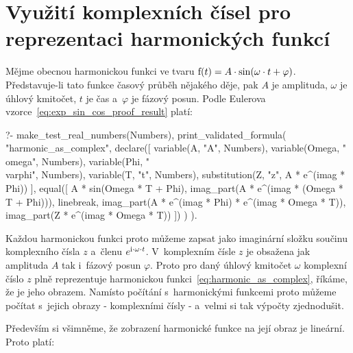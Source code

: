 \section{Využití komplexních čísel pro reprezentaci harmonických funkcí}

Mějme obecnou harmonickou funkci ve tvaru \(\mathrm{f}(t) = A \cdot \sin(\omega \cdot t + \varphi)\). Představuje-li tato funkce časový průběh nějakého děje, pak \(A\) je amplituda, \(\omega\) je úhlový kmitočet, \(t\) je čas a~\(\varphi\) je fázový posun. Podle Eulerova vzorce~\eqref{eq:exp_sin_cos_proof_result} platí:

\begin{prolog}
?-	make_test_real_numbers(Numbers),
	print_validated_formula(
		"harmonic_as_complex",
		declare([
			variable(A, "A", Numbers),
			variable(Omega, "\\omega", Numbers),
			variable(Phi, "\\varphi", Numbers),
			variable(T, "t", Numbers),
			substitution(Z, "z", A * e^(imag * Phi))
		],
			equal([
				A * sin(Omega * T + Phi),
				imag_part(A * e^(imag * (Omega * T + Phi))),
				linebreak,
				imag_part(A * e^(imag * Phi) * e^(imag * Omega * T)),
				imag_part(Z * e^(imag * Omega * T))
			])
		)
	).
\end{prolog}

Každou harmonickou funkci proto můžeme zapsat jako imaginární složku součinu komplexního čísla \(z\) a~členu \(e^{\mathrm{i} \cdot \omega \cdot t}\). V~komplexním čísle \(z\) je obsažena jak amplituda \(A\) tak i~fázový posun \(\varphi\). Proto pro daný úhlový kmitočet \(\omega\) komplexní číslo \(z\) plně reprezentuje harmonickou funkci~\eqref{eq:harmonic_as_complex}, říkáme, že je jeho obrazem. Namísto počítání s~harmonickými funkcemi proto můžeme počítat s~jejich obrazy - komplexními čísly - a~velmi si tak výpočty zjednodušit. 

Především si všimněme, že zobrazení harmonické funkce na její obraz je lineární. Proto platí:


